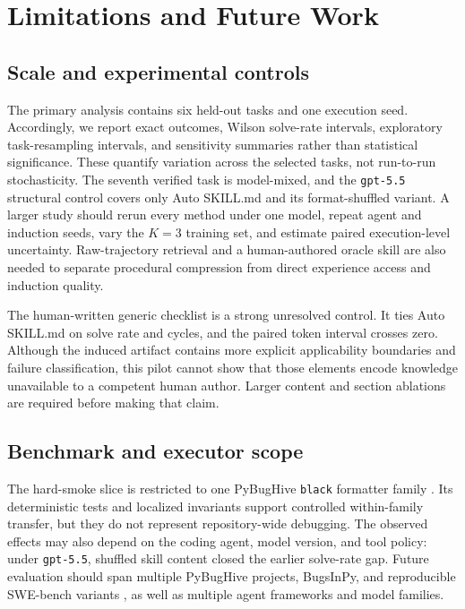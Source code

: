 \section{Limitations and Future Work}
\label{sec:limitations}

\subsection{Scale and experimental controls}

The primary analysis contains six held-out tasks and one execution seed.
Accordingly, we report exact outcomes, Wilson solve-rate intervals, exploratory
task-resampling intervals, and sensitivity summaries rather than statistical
significance. These quantify variation across the selected tasks, not
run-to-run stochasticity. The seventh verified task is model-mixed, and the
\texttt{gpt-5.5} structural control covers only Auto SKILL.md and its
format-shuffled variant. A larger study should rerun every method under one
model, repeat agent and induction seeds, vary the $K=3$ training set, and
estimate paired execution-level uncertainty. Raw-trajectory retrieval and a
human-authored oracle skill are also needed to separate procedural compression
from direct experience access and induction quality.

The human-written generic checklist is a strong unresolved control. It ties
Auto SKILL.md on solve rate and cycles, and the paired token interval crosses
zero. Although the induced artifact contains more explicit applicability
boundaries and failure classification, this pilot cannot show that those
elements encode knowledge unavailable to a competent human author. Larger
content and section ablations are required before making that claim.

\subsection{Benchmark and executor scope}

The hard-smoke slice is restricted to one PyBugHive \texttt{black} formatter
family \cite{antal2024pybughive}. Its deterministic tests and localized
invariants support controlled within-family transfer, but they do not represent
repository-wide debugging. The observed effects may also depend on the coding
agent, model version, and tool policy: under \texttt{gpt-5.5}, shuffled skill
content closed the earlier solve-rate gap. Future evaluation should span
multiple PyBugHive projects, BugsInPy, and reproducible SWE-bench variants
\cite{widyasari2020bugsinpy,jimenez2024swebench}, as well as multiple agent
frameworks and model families.

